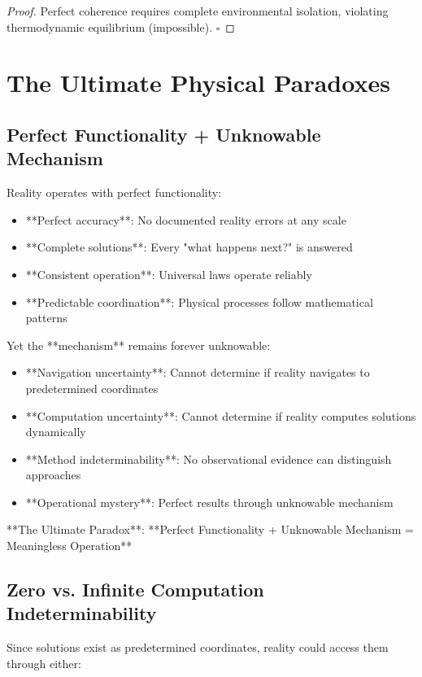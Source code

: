 \documentclass[12pt,a4paper]{article}
\theoremstyle{remark}
\begin{document}
\begin{proof}
Perfect coherence requires complete environmental isolation, violating thermodynamic equilibrium (impossible). $\square$
\end{proof}

\section{The Ultimate Physical Paradoxes}

\subsection{Perfect Functionality + Unknowable Mechanism}

Reality operates with perfect functionality:
\begin{itemize}
\item **Perfect accuracy**: No documented reality errors at any scale
\item **Complete solutions**: Every "what happens next?" is answered
\item **Consistent operation**: Universal laws operate reliably
\item **Predictable coordination**: Physical processes follow mathematical patterns
\end{itemize}

Yet the **mechanism** remains forever unknowable:
\begin{itemize}
\item **Navigation uncertainty**: Cannot determine if reality navigates to predetermined coordinates
\item **Computation uncertainty**: Cannot determine if reality computes solutions dynamically
\item **Method indeterminability**: No observational evidence can distinguish approaches
\item **Operational mystery**: Perfect results through unknowable mechanism
\end{itemize}

**The Ultimate Paradox**: **Perfect Functionality + Unknowable Mechanism = Meaningless Operation**

\subsection{Zero vs. Infinite Computation Indeterminability}

Since solutions exist as predetermined coordinates, reality could access them through either:
\end{document}
